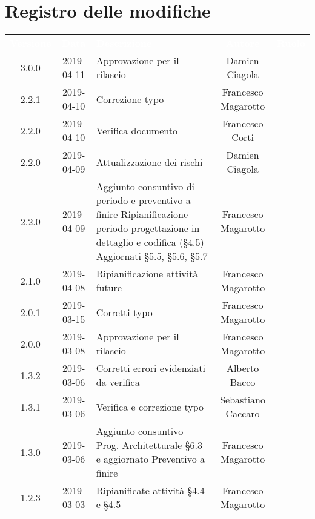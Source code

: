 \section*{Registro delle modifiche}
{
	\renewcommand{\arraystretch}{1.5}
	\centering
	\begin{longtable}{ c c  C{4cm}  c  c }
		
		\textcolor{white}{\textbf{Versione}} & \textcolor{white}{\textbf{Data}} & \textcolor{white}{\textbf{Descrizione}} & \textcolor{white}{\textbf{Autore}} & \textcolor{white}{\textbf{Ruolo}}\\
		3.0.0 & 2019-04-11 & Approvazione per il rilascio & Damien Ciagola & \Res{}\\
		2.2.1 & 2019-04-10 & Correzione typo & Francesco Magarotto & \reda{} \\
		2.2.0 & 2019-04-10 & Verifica documento & Francesco Corti & \ver{} \\
		2.2.0 & 2019-04-09 & Attualizzazione dei rischi & Damien Ciagola & \Res{} \\
		
		2.2.0 & 2019-04-09 & Aggiunto consuntivo di periodo e preventivo a finire \newline Ripianificazione periodo progettazione in dettaglio e codifica (§4.5) \newline Aggiornati §5.5, §5.6, §5.7 & Francesco Magarotto & \reda{}\\
		
		2.1.0 & 2019-04-08 & Ripianificazione attività future & Francesco Magarotto & \reda{} \\
		2.0.1 & 2019-03-15 & Corretti typo & Francesco Magarotto & \reda{}\\
		
		
		2.0.0 & 2019-03-08 & Approvazione per il rilascio & Francesco Magarotto & \Res{}\\
		
		1.3.2 & 2019-03-06 & Corretti errori evidenziati da verifica & Alberto Bacco & \reda{}\\
		
		1.3.1 & 2019-03-06 & Verifica e correzione typo & Sebastiano Caccaro & \ver{}\\

		1.3.0 & 2019-03-06 & Aggiunto consuntivo Prog. Architetturale §6.3 e aggiornato Preventivo a finire & Francesco Magarotto & \reda{}\\

		1.2.3 & 2019-03-03 & Ripianificate attività §4.4 e §4.5 & Francesco Magarotto & \reda{}\\


\end{longtable}}
